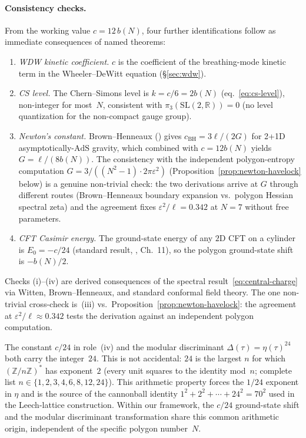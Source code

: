 \paragraph{Consistency checks.}
From the working value $c = 12\,b(N)$, four further identifications
follow as immediate consequences of named theorems:
\begin{enumerate}
\item[(i)] \emph{WDW kinetic coefficient.}
  $c$ is the coefficient of the breathing-mode kinetic term
  in the Wheeler--DeWitt equation (\S\ref{sec:wdw}).

\item[(ii)] \emph{CS level.} The Chern--Simons level is
  $k = c/6 = 2b(N)$ (eq.~\eqref{eq:cs-level}),
  non-integer for most~$N$, consistent with
  $\pi_3(\mathrm{SL}(2,\mathbb{R})) = 0$ (no level
  quantization for the non-compact gauge group).

\item[(iii)] \emph{Newton's constant.} Brown--Henneaux
  (\citealt{BrownHenneaux1986}) gives
  $c_{\mathrm{BH}} = 3\ell/(2G)$
  for 2+1D asymptotically-$\mathrm{AdS}$ gravity,
  which combined with $c = 12b(N)$ yields
  $G = \ell/(8b(N))$.
  The consistency with the independent polygon-entropy
  computation $G = 3/((N^2{-}1) \cdot 2\pi\varepsilon^2)$
  (Proposition~\ref{prop:newton-havelock} below)
  is a genuine non-trivial check:
  the two derivations arrive at $G$ through different routes
  (Brown--Henneaux boundary expansion vs.\ polygon Hessian
  spectral zeta) and the agreement fixes $\varepsilon^2/\ell
  = 0.342$ at $N = 7$ without free parameters.

\item[(iv)] \emph{CFT Casimir energy.}
  The ground-state energy of any $2$D CFT on a cylinder is
  $E_0 = -c/24$
  (standard result, \citealt{DiFrancesco1997}, Ch.~11),
  so the polygon ground-state shift is $-b(N)/2$.
\end{enumerate}
Checks (i)--(iv) are derived consequences of the spectral
result~\eqref{eq:central-charge} via Witten, Brown--Henneaux,
and standard conformal field theory.
The one non-trivial cross-check is~(iii) vs.\
Proposition~\ref{prop:newton-havelock}: the agreement at
$\varepsilon^2/\ell \approx 0.342$ tests the derivation
against an independent polygon computation.

\begin{remark}
\label{rem:why-24}
The constant $c/24$ in role~(iv) and the modular discriminant
$\Delta(\tau) = \eta(\tau)^{24}$ both carry the integer~$24$.
This is not accidental: $24$ is the largest $n$ for which
$(\mathbb{Z}/n\mathbb{Z})^*$ has exponent~$2$
(every unit squares to the identity mod~$n$; complete list
$n \in \{1,2,3,4,6,8,12,24\}$).
This arithmetic property forces the $1/24$ exponent in
$\eta$ and is the source of the cannonball identity
$1^2 + 2^2 + \cdots + 24^2 = 70^2$ used in the
Leech-lattice construction.
Within our framework, the $c/24$ ground-state shift
and the modular discriminant transformation share this
common arithmetic origin, independent of the specific
polygon number~$N$.
\end{remark}

